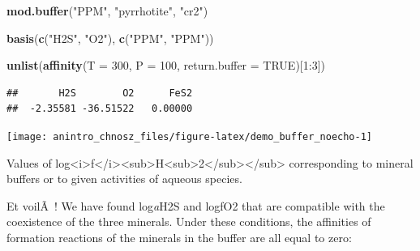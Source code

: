\documentclass[]{tufte-handout}
\newenvironment{Shaded}{}{}
\newcommand{\KeywordTok}[1]{\textcolor[rgb]{0.00,0.44,0.13}{\textbf{#1}}}
\newcommand{\DataTypeTok}[1]{\textcolor[rgb]{0.56,0.13,0.00}{#1}}
\newcommand{\DecValTok}[1]{\textcolor[rgb]{0.25,0.63,0.44}{#1}}
\newcommand{\StringTok}[1]{\textcolor[rgb]{0.25,0.44,0.63}{#1}}
\newcommand{\OtherTok}[1]{\textcolor[rgb]{0.00,0.44,0.13}{#1}}
\newcommand{\OperatorTok}[1]{\textcolor[rgb]{0.40,0.40,0.40}{#1}}
\newcommand{\NormalTok}[1]{#1}
\begin{document}
\begin{Shaded}
\begin{Highlighting}[]
\KeywordTok{mod.buffer}\NormalTok{(}\StringTok{"PPM"}\NormalTok{, }\StringTok{"pyrrhotite"}\NormalTok{, }\StringTok{"cr2"}\NormalTok{)}
\end{Highlighting}
\end{Shaded}

\begin{Shaded}
\begin{Highlighting}[]
\KeywordTok{basis}\NormalTok{(}\KeywordTok{c}\NormalTok{(}\StringTok{"H2S"}\NormalTok{, }\StringTok{"O2"}\NormalTok{), }\KeywordTok{c}\NormalTok{(}\StringTok{"PPM"}\NormalTok{, }\StringTok{"PPM"}\NormalTok{))}
\end{Highlighting}
\end{Shaded}

\begin{Shaded}
\begin{Highlighting}[]
\KeywordTok{unlist}\NormalTok{(}\KeywordTok{affinity}\NormalTok{(}\DataTypeTok{T =} \DecValTok{300}\NormalTok{, }\DataTypeTok{P =} \DecValTok{100}\NormalTok{, }\DataTypeTok{return.buffer =} \OtherTok{TRUE}\NormalTok{)[}\DecValTok{1}\OperatorTok{:}\DecValTok{3}\NormalTok{])}
\end{Highlighting}
\end{Shaded}

\begin{verbatim}
##       H2S        O2      FeS2 
##  -2.35581 -36.51522   0.00000
\end{verbatim}

\begin{marginfigure}
\texttt{[image: anintro\_chnosz\_files/figure-latex/demo\_buffer\_noecho-1]} \caption[Values of log<i>f</i><sub>H<sub>2</sub></sub> corresponding to mineral buffers or to given activities of aqueous species]{Values of log<i>f</i><sub>H<sub>2</sub></sub> corresponding to mineral buffers or to given activities of aqueous species.}\label{fig:demo_buffer_noecho}
\end{marginfigure}

Et voilÃ~! We have found log\emph{a}H2S and logfO2 that are compatible
with the coexistence of the three minerals. Under these conditions, the
affinities of formation reactions of the minerals in the buffer are all
equal to zero:

\begin{Shaded}
\end{Shaded}
\end{document}
